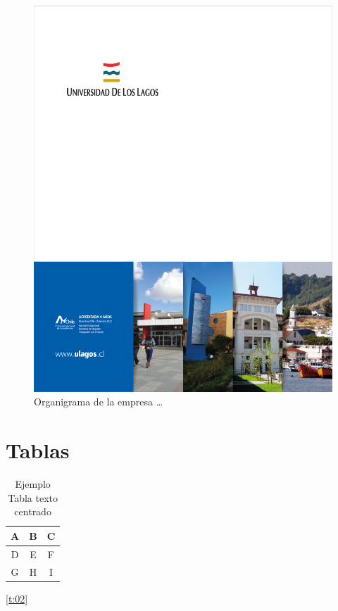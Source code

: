 \documentclass[letter,12pt]{report}
\begin{document}
\begin{figure}[H]
\centering
 \includegraphics[scale=0.1]{portada}
  \caption{Organigrama de la empresa \dots}
\end{figure}

\section{Tablas}

\blindtext %

\begin{table}[H]
\centering
\begin{tabular}{|c|c|c|}\hline
  A&B &C \\
  \hline
  D&E &F \\
 G & H& I\\\hline
\end{tabular}
\caption{Ejemplo Tabla texto centrado}
\label{t:01}
\end{table}

\blindtext %
 \ref{t:02}
\end{document}
